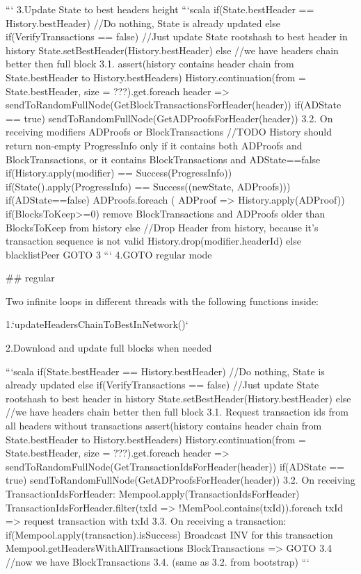 \documentclass[]{report}   %
\begin{document}
```
3.Update State to best headers height
```scala
  if(State.bestHeader == History.bestHeader) {
    //Do nothing, State is already updated
  } else if(VerifyTransactions == false) {
    //Just update State rootshash to best header in history
    State.setBestHeader(History.bestHeader)
  } else {
    //we have headers chain better then full block         
    3.1. 
      assert(history contains header chain from State.bestHeader to History.bestHeaders)
      History.continuation(from = State.bestHeader, size = ???).get.foreach { header => 
        sendToRandomFullNode(GetBlockTransactionsForHeader(header))
        if(ADState == true) sendToRandomFullNode(GetADProofsForHeader(header))
      }
    3.2. On receiving modifiers ADProofs or BlockTransactions
      //TODO History should return non-empty ProgressInfo only if it contains both ADProofs and BlockTransactions, or it contains BlockTransactions and ADState==false
      if(History.apply(modifier) == Success(ProgressInfo)) {
        if(State().apply(ProgressInfo) == Success((newState, ADProofs))) {
          if(ADState==false) ADProofs.foreach ( ADProof => History.apply(ADProof))
          if(BlocksToKeep>=0) remove BlockTransactions and ADProofs older than BlocksToKeep from history
        } else {
          //Drop Header from history, because it's transaction sequence is not valid
          History.drop(modifier.headerId)
        }
      } else {
        blacklistPeer
      }
      GOTO 3
    }
```
4.GOTO regular mode


## regular

Two infinite loops in different threads with the following functions inside:

1.`updateHeadersChainToBestInNetwork()`

2.Download and update full blocks when needed

```scala
  if(State.bestHeader == History.bestHeader) {
    //Do nothing, State is already updated
  } else if(VerifyTransactions == false) {
    //Just update State rootshash to best header in history
    State.setBestHeader(History.bestHeader)
  } else {
    //we have headers chain better then full block         
    3.1. Request transaction ids from all headers without transactions
      assert(history contains header chain from State.bestHeader to History.bestHeaders)
      History.continuation(from = State.bestHeader, size = ???).get.foreach { header => 
        sendToRandomFullNode(GetTransactionIdsForHeader(header))
        if(ADState == true) sendToRandomFullNode(GetADProofsForHeader(header))
      }
    3.2. On receiving TransactionIdsForHeader:
      Mempool.apply(TransactionIdsForHeader)
      TransactionIdsForHeader.filter(txId => !MemPool.contains(txId)).foreach { txId => 
        request transaction with txId
      }
    3.3. On receiving a transaction:
      if(Mempool.apply(transaction).isSuccess) {
         Broadcast INV for this transaction
         Mempool.getHeadersWithAllTransactions { BlockTransactions =>
            GOTO 3.4 //now we have BlockTransactions
         }
      }
    3.4. (same as 3.2. from bootstrap)
  }
```





\end{document}
